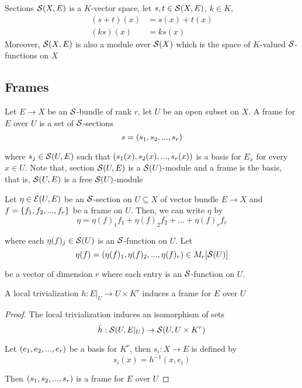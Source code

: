 \begin{remark}
\end{remark}

\begin{proposition}
	Sections $\mathcal{S}(X, E)$ is a $K$-vector space, let $s, t \in \mathcal{S}(X, E)$, $k \in K$,
	\begin{align*}
		(s + t)(x) &= s(x) + t(x) \\
		(k s)(x) &= k s(x)
	\end{align*}
	Moreover, $\mathcal{S}(X, E)$ is also a module over $\mathcal{S}(X)$ which is the space of $K$-valued $\mathcal{S}$-functions on $X$
\end{proposition}

\subsection{Frames}

\begin{definition}[frame]
	Let $E \to X$ be an $\mathcal{S}$-bundle of rank $r$, let $U$ be an open subset on $X$. A frame for $E$ over $U$ is a set of $\mathcal{S}$-sections
	$$
	s = (s_1, s_2, ..., s_r)
	$$
	
	where $s_j \in \mathcal{S}(U, E)$ such that $(s_1(x), s_2(x), ..., s_r(x))$ is a basis for $E_x$ for every $x \in U$. Note that, section $\mathcal{S}(U, E)$ is a $\mathcal{S}(U)$-module and a frame is the basis, that is, $\mathcal{S}(U, E)$ is a free $\mathcal{S}(U)$-module
\end{definition}

\begin{remark}
	Let $\eta \in \mathcal{E}(U, E)$ be an $\mathcal{S}$-section on $U \subseteq X$ of vector bundle $E \to X$ and $f = \{f_1, f_2, ..., f_r\}$ be a frame on $U$. Then, we can write $\eta$ by
	$$
	\eta = \eta(f)_1 f_1 + \eta(f)_2 f_2 + ... + \eta(f)_r f_r
	$$
	
	where each $\eta(f)_j \in \mathcal{S}(U)$ is an $\mathcal{S}$-function on $U$. Let 
	$$
	\eta(f) = (\eta(f)_1, \eta(f)_2, ..., \eta(f)_r) \in M_r[\mathcal{S}(U)]
	$$
	
	be a vector of dimension $r$ where each entry is an $\mathcal{S}$-function on $U$. 
\end{remark}

\begin{proposition}
	A local trivialization $h: E\vert_U \to U \times K^r$ induces a frame for $E$ over $U$
	\begin{proof}
		The local trivialization induces an isomorphism of sets
		$$
		\Tilde{h}: \mathcal{S}(U, E\vert_U) \to \mathcal{S}(U, U \times K^r)
		$$
		
		Let $(e_1, e_2, ..., e_r)$ be a basis for $K^r$, then $s_i: X \to E$ is defined by
		$$
		s_i(x) = h^{-1}(x, e_i)
		$$
		
		Then $(s_1, s_2, ..., s_r)$ is a frame for $E$ over $U$
	\end{proof}
\end{proposition}


